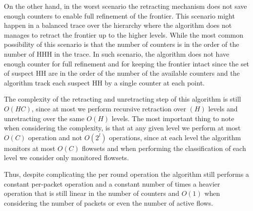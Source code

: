 On the other hand, in the worst scenario the retracting mechanism does not save enough counters to enable full refinement of the frontier. This scenario might happen in a balanced trace over the hierarchy where the algorithm does not manages to retract the frontier up to the higher levels. While the most common possibility of this scenario is that the number of counters is in the order of the number of HHH in the trace. In such scenario, the algorithm does not have enough counter for full refinement and for keeping the frontier intact since the set of suspect HH are in the order of the number of the available counters and the algorithm track each suspect HH by a single counter at each point.

The complexity of the retracting and unretracting step of this algorithm is still $O(HC)$, since at most we perform recursive retraction over $(H)$ levels and unretracting over the same $O(H)$ levels. The most important thing to note when considering the complexity, is that at any given level we perform at most $O(C)$ operation and not $O(2^l)$ operations, since  at each level the algorithm monitors at most $O(C)$ flowsets and when performing the classification of each level we consider only monitored flowsets.

Thus, despite complicating the per round operation the algorithm still performs a constant per-packet operation and a constant number of times a  heavier operation that is still linear in the number of counters and $O(1)$ when considering the number of packets or even the number of active flows.

